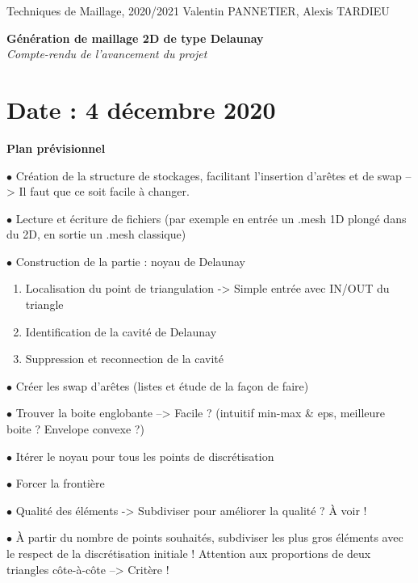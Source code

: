 \documentclass[11pt]{article}
\def \vn {\vspace{3 mm} \noindent}
\begin{document}
\noindent
Techniques de Maillage, 2020/2021 \hfill Valentin PANNETIER, Alexis TARDIEU

\vspace{5mm}

\begin{center}
	\Large{\textbf{Génération de maillage 2D de type Delaunay}} \\[2mm]
	\Large{\textit{Compte-rendu de l'avancement du projet}}
\end{center}

\vspace{5mm}

\tableofcontents
\vn


\section{Date : 4 décembre 2020}
\noindent
\textbf{Plan prévisionnel}

\vn
$\bullet$ Création de la structure de stockages, facilitant l'insertion d'arêtes et de swap --> Il faut que ce soit facile à changer.

\vn
$\bullet$ Lecture et écriture de fichiers (par exemple en entrée un .mesh 1D plongé dans du 2D, en sortie un .mesh classique)


\vn
$\bullet$ Construction de la partie : noyau de Delaunay

\begin{enumerate}
	\item Localisation du point de triangulation -> Simple entrée avec IN/OUT du triangle
	\item Identification de la cavité de Delaunay
	\item Suppression et reconnection de la cavité
\end{enumerate}

\vn
$\bullet$ Créer les swap d'arêtes (listes et étude de la façon de faire)

\vn
$\bullet$ Trouver la boite englobante --> Facile ? (intuitif min-max \& eps, meilleure boite ? Envelope convexe ?)

\vn
$\bullet$ Itérer le noyau pour tous les points de discrétisation 

\vn
$\bullet$ Forcer la frontière

\vn
$\bullet$ Qualité des éléments -> Subdiviser pour améliorer la qualité ? À voir !

\vn
$\bullet$ À partir du nombre de points souhaités, subdiviser les plus gros éléments avec le respect de la discrétisation initiale ! Attention aux proportions de deux triangles côte-à-côte --> Critère !
\end{document}
